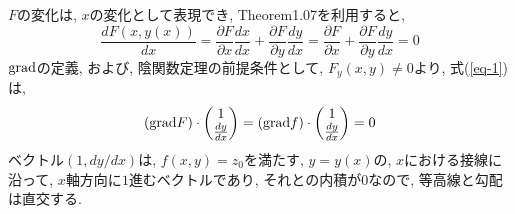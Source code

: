 \documentclass{jsarticle}
\newcommand*{\grad}{{\rm grad}}
\begin{document}
$F$の変化は, $x$の変化として表現でき, Theorem1.07を利用すると, 
\begin{equation}\label{eq-1}
  \frac{dF(x, y(x))}{dx} = \frac{\partial F}{\partial x}\frac{dx}{dx} + \frac{\partial F}{\partial y}\frac{dy}{dx}
  = \frac{\partial F}{\partial x} + \frac{\partial F}{\partial y}\frac{dy}{dx} = 0
\end{equation}
$\grad$の定義, および, 陰関数定理の前提条件として, $F_y(x, y) \neq 0$より, 式(\ref{eq-1})は, 
\begin{equation}
  (\grad F) 
  \cdot
  \begin{pmatrix}
    1 \\
    \frac{dy}{dx} \\
  \end{pmatrix}
  =
  (\grad f) 
  \cdot
  \begin{pmatrix}
    1 \\
    \frac{dy}{dx} \\
  \end{pmatrix}
  = 0
\end{equation}
ベクトル$(1, dy/dx)$は, $f(x, y) = z_0$を満たす, $y = y(x)$の, $x$における接線に沿って, $x$軸方向に$1$進むベクトルであり,
それとの内積が$0$なので, 等高線と勾配は直交する. 
\end{document}
